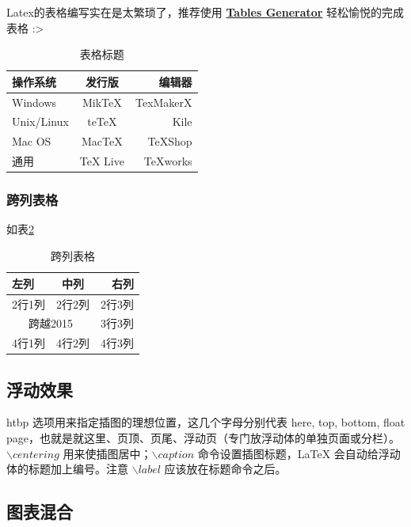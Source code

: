 Latex的表格编写实在是太繁琐了，推荐使用 \textbf{\href{http://www.tablesgenerator.com/}{Tables Generator}} 轻松愉悦的完成表格 :>

\begin{table}[htbp]
    \centering
    \begin{tabular}{|l|c|r|}
         \hline
        操作系统& 发行版& 编辑器\\
         \hline
        Windows & MikTeX & TexMakerX \\
         \hline
        Unix/Linux & teTeX & Kile \\
         \hline
        Mac OS & MacTeX & TeXShop \\
         \hline
        通用& TeX Live & TeXworks \\
         \hline
    \end{tabular}
    \caption{表格标题}
    \label{tab:mytab2}
\end{table}

\subsubsection{跨列表格}
如表\ref{tab:mytab3}
\begin{table}[htbp]
    \centering
    \begin{tabular}{|l|c|r|}
      \hline
      左列 & 中列 & 右列 \\
      \hline
      2行1列 & 2行2列 & 2行3列 \\
      \hline
      \multicolumn{2}{|c|}{跨越2015} & 3行3列 \\
      \hline
      4行1列 & 4行2列 & 4行3列 \\
      \hline
    \end{tabular}
    \caption{跨列表格}
    \label{tab:mytab3}
\end{table}

\subsection{浮动效果}
 htbp 选项用来指定插图的理想位置，这几个字母分别代表 here, top, bottom, float page，也就是就这里、页顶、页尾、浮动页（专门放浮动体的单独页面或分栏）。$\backslash centering$ 用来使插图居中；$\backslash caption$ 命令设置插图标题，LaTeX 会自动给浮动体的标题加上编号。注意 $\backslash label$ 应该放在标题命令之后。

\subsection{图表混合}
